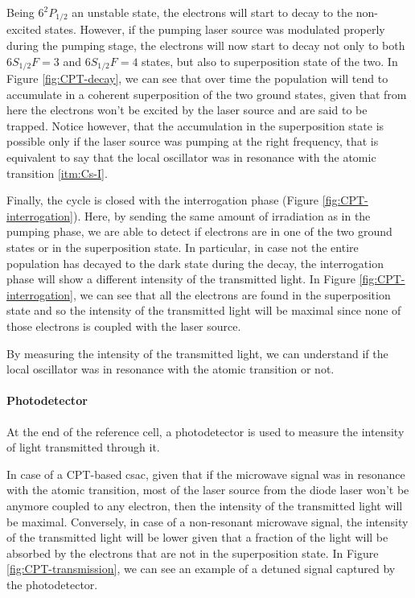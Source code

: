 Being $6^2P_{1/2}$ an unstable state, the electrons will start to decay to the non-excited states.
However, if the pumping laser source was modulated properly during the pumping stage, the electrons will now start to decay not only to both $6S_{1/2} F=3$ and $6S_{1/2} F=4$ states, but also to superposition state of the two.
In Figure \ref{fig:CPT-decay}, we can see that over time the population will tend to accumulate in a coherent superposition of the two ground states, given that from here the electrons won't be excited by the laser source and are said to be trapped.
Notice however, that the accumulation in the superposition state is possible only if the laser source was pumping at the right frequency, that is equivalent to say that the local oscillator was in resonance with the atomic transition \ref{itm:Cs-I}.

Finally, the cycle is closed with the interrogation phase (Figure \ref{fig:CPT-interrogation}).
Here, by sending the same amount of irradiation as in the pumping phase, we are able to detect if electrons are in one of the two ground states or in the superposition state.
In particular, in case not the entire population has decayed to the dark state during the decay, the interrogation phase will show a different intensity of the transmitted light.
In Figure \ref{fig:CPT-interrogation}, we can see that all the electrons are found in the superposition state and so the intensity of the transmitted light will be maximal since none of those electrons is coupled with the laser source.

By measuring the intensity of the transmitted light, we can understand if the local oscillator was in resonance with the atomic transition or not.


\paragraph{Photodetector}

At the end of the reference cell, a photodetector is used to measure the intensity of light transmitted through it.

In case of a CPT-based \acrshort{csac}, given that if the microwave signal was in resonance with the atomic transition, most of the laser source from the diode laser won't be anymore coupled to any electron, then the intensity of the transmitted light will be maximal.
Conversely, in case of a non-resonant microwave signal, the intensity of the transmitted light will be lower given that a fraction of the light will be absorbed by the electrons that are not in the superposition state.
In Figure \ref{fig:CPT-transmission}, we can see an example of a detuned signal captured by the photodetector.

